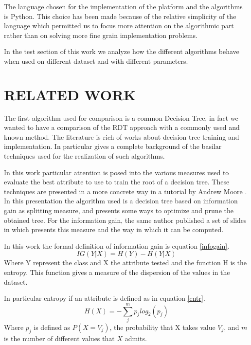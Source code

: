 \documentclass{acm_proc_article-sp-sigmod07}
\begin{document}
The language chosen for the implementation of the platform and the
algorithms is Python. This choice has been made because of the relative
simplicity of the language which permitted us to focus more attention on
the algorithmic part rather than on solving more fine grain implementation
problems.

In the test section of this work we analyze how the different algorithms
behave when used on different dataset and with different parameters. 

\section{RELATED WORK}

The first algorithm used for comparison is a common Decision Tree, in fact
we wanted to have a comparison of the RDT approach with a commonly used
and known method.
The literature is rich of works about decision tree training and
implementation. In particular \cite{quinlan:induction} gives a complete
background of the basilar techniques used for the realization of such
algorithms.

In this work particular attention is posed into the various measures used
to evaluate the best attribute to use to train the root of a decision
tree.
These techniques are presented in a more concrete way in a tutorial by
Andrew Moore \cite{moore:dtree}. In this presentation the algorithm used is
a decision tree based on information gain as splitting measure, and
presents some ways to optimize and prune the obtained tree.
For the information gain, the same author published a set of slides
in which presents this measure and the way in which it can be computed.

In this work the formal definition of information gain is equation
\ref{infogain}.
\begin{equation}
IG(Y|X) = H(Y) - H(Y|X)
\label{infogain}
\end{equation}
Where Y represent the class and X the attribute tested and the function H
is the entropy.
This function gives a measure of the dispersion of the values in the
dataset.

In particular entropy if an attribute is defined as in equation
\ref{entr}.
\begin{equation}
H(X) = -\sum_{j}^{m} p_j log_2(p_j)
\label{entr}
\end{equation}
Where $p_j$ is defined as $P(X = V_j)$, the probability that X takes value
$V_j$, and $m$ is the number of different values that $X$ admits.
\end{document}
